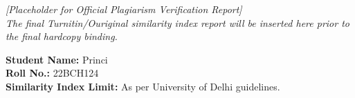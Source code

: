 
\vspace{3cm}

\begin{center}
    \textit{[Placeholder for Official Plagiarism Verification Report]} \\
    \vspace{1cm}
    \textit{The final Turnitin/Ouriginal similarity index report will be inserted here prior to the final hardcopy binding.}
\end{center}

\vspace{3cm}

\noindent \textbf{Student Name:} Princi \\
\textbf{Roll No.:} 22BCH124 \\
\textbf{Similarity Index Limit:} As per University of Delhi guidelines.
